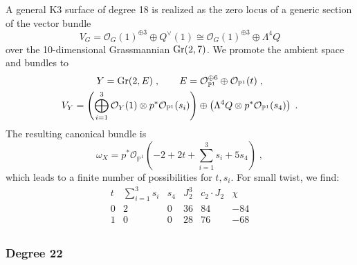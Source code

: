 \documentclass[11pt,a4paper]{article}
\numberwithin{equation}{section}
\numberwithin{table}{section}\setlength{\multlinegap}{25pt}
\begin{document}
A general K3 surface of degree 18 is realized as the zero locus of a generic section of the vector bundle~\cite{Mukai2}
\begin{equation}
    \label{eq:Degree18FiberDefiningBundle}
    V_G=\mathcal{O}_G(1)^{\oplus 3}\oplus Q^\vee (1)\cong \mathcal{O}_G(1)^{\oplus 3}\oplus\Lambda^4 Q
\end{equation}
over the 10-dimensional Grassmannian $\textup{Gr}(2,7)$. We promote the ambient space and bundles to
\begin{equation}
    \begin{gathered}
    Y = \textup{Gr}(2,E)\;,\qquad E = \mathcal{O}_{\mathbb{P}^1}^{\oplus 6}\oplus \mathcal{O}_{\mathbb{P}^1}(t)\;,\\
    V_Y=\left(\bigoplus_{i=1}^3\mathcal{O}_Y(1)\otimes p^*\mathcal{O}_{\mathbb{P}^1}(s_i)\right)\oplus \left(\Lambda^4 Q\otimes p^*\mathcal{O}_{\mathbb{P}^1}(s_4)\right)\;.
    \end{gathered}
\end{equation}
The resulting canonical bundle is
\begin{equation}
    \omega_X=p^*\mathcal{O}_{\mathbb{P}^1}(-2+2t+\textstyle{\sum}_{i=1}^3s_i+5s_4)\;,
\end{equation}
which leads to a finite number of possibilities for $t,s_i$. For small twist, we find:
\begin{equation}
    \begin{array}{cccccc}
        t & \textstyle{\sum}_{i=1}^3s_i & s_4 & J_2^3 & c_2\cdot J_2 & \chi\\
        \hline
        0 & 2 & 0 & 36 & 84 & -84\\
        1 & 0 & 0 & 28 & 76 & -68\\
    \end{array}
\end{equation}

\subsubsection*{Degree 22}
\end{document}
